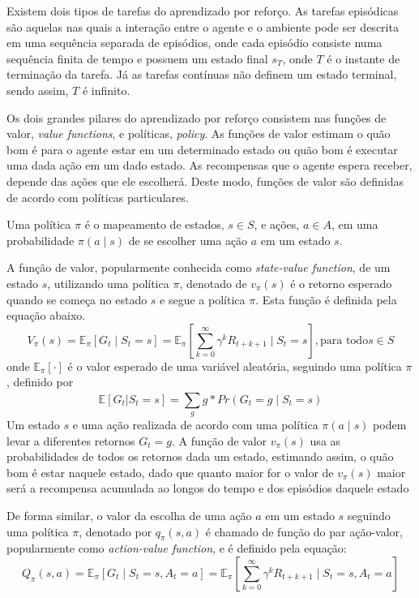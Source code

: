 Existem dois tipos de tarefas do aprendizado por reforço. As tarefas episódicas são aquelas
nas quais a interação entre o agente e o ambiente pode ser descrita em uma sequência 
separada de episódios, onde cada episódio consiste numa sequência finita de tempo e 
possuem um estado final \(s_{T}\), onde \(T\) é o instante de terminação
da tarefa. Já as tarefas contínuas não definem um estado terminal, sendo assim,
\(T\) é infinito.

Os dois grandes pilares do aprendizado por reforço consistem nas funções de valor, 
\textit{value functions}, e políticas, \textit{policy}. As funções de valor estimam
o quão bom é para o agente estar em um determinado estado ou quão bom é executar
uma dada ação em um dado estado. As recompensas que o agente espera receber,
depende das ações que ele escolherá. Deste modo, funções de valor são
definidas de acordo com políticas particulares. 

Uma política \(\pi\) é o mapeamento de estados, \(s \in S\),
e ações, \(a \in A\), em uma probabilidade \(\pi(a \mid s)\) de se escolher uma 
ação \(a\) em um estado \(s\).

A função de valor, popularmente conhecida como \textit{state-value function},
de um estado \(s\), utilizando uma política \(\pi\), denotado
de \(v_{\pi}(s)\) é o retorno esperado quando se começa no estado \(s\) e segue
a política \(\pi\). Esta função é definida pela equação abaixo. 
\begin{equation}
    \label{eq:v_value}
    V_{\pi}(s) = \mathbb{E}_{\pi}[G_{t} \mid S_{t} = s] = \mathbb{E}_{\pi} 
    [\sum_{k=0}^{\infty}\gamma^k R_{t+k+1} \mid S_{t} = s], \text{para todo} s \in S
\end{equation}
\noindent onde \(\mathbb{E}_{\pi}[\cdot]\) é o valor esperado de uma variável aleatória,
seguindo uma política \(\pi\), definido por
\begin{equation}
    \mathbb{E}[G_{t}| S_{t} = s] = \sum_{g}^{} g * Pr(G_{t} = g \mid S_{t} = s)
\end{equation}
Um estado \(s\) e uma ação realizada de acordo com uma política \(\pi(a \mid s)\) 
podem levar a diferentes retornos \(G_{t} = g\). A função de valor \(v_{\pi}(s)\) 
usa as probabilidades de todos os retornos dada um estado, 
estimando assim, o quão bom é estar naquele estado, dado que quanto maior for
o valor de \(v_{\pi}(s)\) maior será a recompensa acumulada ao longos do tempo e dos
episódios daquele estado

De forma similar, o valor da escolha de uma ação \(a\) em um estado \(s\) seguindo uma
política \(\pi\), denotado por \(q_{\pi}(s, a)\) é chamado de função do par 
ação-valor, popularmente como \textit{action-value function}, e é definido pela equação:
\begin{equation}
    \label{eq:q_value}
    Q_{\pi}(s, a) = \mathbb{E}_{\pi}[G_{t} \mid S_{t} = s, A_{t} = a] = \mathbb{E}_{\pi} 
    [\sum_{k=0}^{\infty}\gamma^k R_{t+k+1} \mid S_{t} = s, A_{t} = a]
\end{equation}

